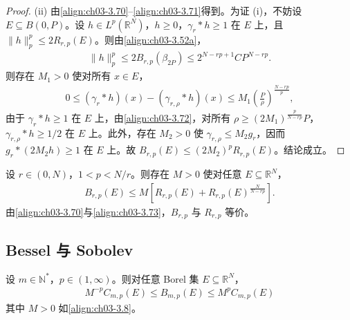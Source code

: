 \documentclass[../../main.tex]{subfiles}%
\begin{document}
\begin{proof}
(ii) 由\eqref{align:ch03-3.70}--\eqref{align:ch03-3.71}得到。为证 (i)，不妨设 $E\subseteq B(0,P)$。设 $h\in L^p(\mathbb{R}^N)$，$h\geqslant0$，$\gamma_r*h\geqslant1$ 在 $E$ 上，且 $\|h\|_p^p\leqslant2R_{r,p}(E)$。则由\eqref{align:ch03-3.52a}，
\begin{align*}
\|h\|_p^p\leqslant2B_{r,p}(\beta_{2P})\leqslant 2^{N-rp+1}CP^{N-rp}.
\end{align*}
则存在 $M_1>0$ 使对所有 $x\in E$，
\begin{align}
0\leqslant(\gamma_r*h)(x)-(\gamma_{r,\rho}*h)(x)
\leqslant M_1\left(\frac P\rho\right)^{\frac{N-rp}{p}},\label{align:ch03-3.72}
\end{align}
由于 $\gamma_r*h\geqslant1$ 在 $E$ 上，由\eqref{align:ch03-3.72}，对所有 $\rho\geqslant(2M_1)^{\frac p{N-rp}}P$，$\gamma_{r,\rho}*h\geqslant1/2$ 在 $E$ 上。此外，存在 $M_2>0$ 使 $\gamma_{r,\rho}\leqslant M_2g_r$，因而 $g_r*(2M_2h)\geqslant1$ 在 $E$ 上。故 $B_{r,p}(E)\leqslant(2M_2)^pR_{r,p}(E)$。结论成立。
\end{proof}

\begin{remark}\label{remark:ch03-BesselRiesz一般}
设 $r\in(0,N)$，$1<p<N/r$。则存在 $M>0$ 使对任意 $E\subseteq\mathbb{R}^N$，
\begin{align}
B_{r,p}(E)\leqslant M\left[R_{r,p}(E)+R_{r,p}(E)^{\frac N{N-rp}}\right].\label{align:ch03-3.73}
\end{align}
由\eqref{align:ch03-3.70}与\eqref{align:ch03-3.73}，$B_{r,p}$ 与 $R_{r,p}$ 等价。
\end{remark}

\subsection{Bessel 与 Sobolev}\label{subsection:ch03-BesselSobolev}

\begin{theorem}\label{theorem:ch03-BesselSobolev等价}\label{theorem:ch03-Sobolev基本}
设 $m\in\mathbb{N}^*$，$p\in(1,\infty)$。则对任意 Borel 集 $E\subseteq\mathbb{R}^N$，
\begin{align}
M^{-p}C_{m,p}(E)\leqslant B_{m,p}(E)\leqslant M^pC_{m,p}(E)\label{align:ch03-3.74}
\end{align}
其中 $M>0$ 如\eqref{align:ch03-3.8}。
\end{theorem}
\end{document}
